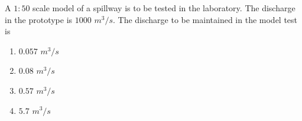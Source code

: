 	  \item A $1:50$ scale model of a spillway is to be tested in the laboratory. The discharge in the prototype is $1000$ $m^3/s$. The discharge to be maintained in the model test is
		  \begin{enumerate}
			  \item $0.057$ $m^3/s$
			  \item $0.08$ $m^3/s$
			  \item $0.57$ $m^3/s$
			  \item $5.7$ $m^3/s$
		  \end{enumerate}

